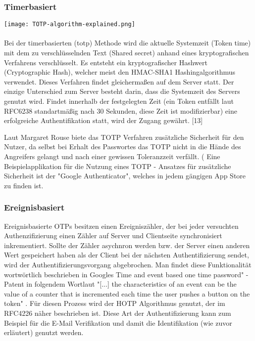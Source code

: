 \subsubsection{Timerbasiert}
 \texttt{[image: TOTP-algorithm-explained.png]} \\\\
 Bei der timerbasierten (\ac{totp}) Methode wird die aktuelle Systemzeit (Token time) mit dem zu verschlüsselnden Text (Shared secret) anhand eines kryptografischen Verfahrens verschlüsselt. Es entsteht ein kryptografischer Hashwert (Cryptographic Hash), welcher meist den HMAC-SHA1 Hashingalgorithmus verwendet. Dieses Verfahren findet gleichermaßen auf dem Server statt. Der einzige Unterschied zum Server besteht darin, dass die Systemzeit des Servers genutzt wird. Findet innerhalb der festgelegten Zeit (ein Token entfällt laut RFC6238 standartmäßig nach 30 Sekunden, diese Zeit ist modifizierbar) eine erfolgreiche Authentifikation statt, wird der Zugang gewährt. [13]
 
 Laut Margaret Rouse biete das TOTP Verfahren zusätzliche Sicherheit für den Nutzer, da selbst bei Erhalt des Passwortes das TOTP nicht in die Hände des Angreifers gelangt und nach einer gewissen Toleranzzeit verfällt. (\cite{A5} Eine Beispielapplikation für die Nutzung eines TOTP - Ansatzes für zusätzliche Sicherheit ist der "Google Authenticator", welches in jedem gängigen App Store zu finden ist.

\subsubsection{Ereignisbasiert}
Ereignisbasierte OTPs besitzen einen Ereigniszähler, der bei jeder versuchten Authenzifizierung einen Zähler auf Server und Clientseite synchronisiert inkrementiert. Sollte der Zähler asychnron werden bzw. der Server einen anderen Wert gespeichert haben als der Client bei der nächsten Authentifizierung sendet, wird der Authentifizierungsvorgang abgebrochen. Man findet diese Funktionalität wortwörtlich beschrieben in Googles Time and event based one time password" - Patent \cite{A6} in folgendem Wortlaut "[...] the characteristics of an event can be the value of a counter that is incremented each time the user pushes a button on the token" \cite{A6}. Für diesen Prozess wird der HOTP Algorithmus genutzt, der im RFC4226 näher beschrieben ist. Diese Art der Authentifizierung kann zum Beispiel für die E-Mail Verifikation und damit die Identifikation (wie zuvor erläutert) genutzt werden.
	
